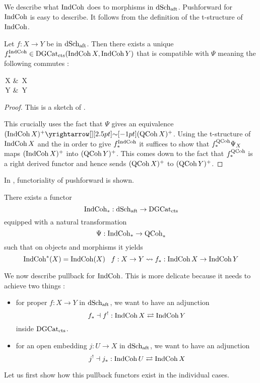 \documentclass[./main.tex]{subfiles}
\begin{document}
We describe what $\mathrm{IndCoh}$ does to morphisms in $\mathrm{dSch}_{\mathrm{aft}}$.
Pushforward for $\mathrm{IndCoh}$ is easy to describe.
It follows from the definition of the t-structure of $\mathrm{IndCoh}$.

\begin{prop}

  Let $f : X \to Y$ be in $\mathrm{dSch}_{\mathrm{aft}}$.
  Then there exists a unique 
  $f_*^{\mathrm{IndCoh}} \in \mathrm{DGCat}_{\mathrm{cts}}(\mathrm{IndCoh}\,X , \mathrm{IndCoh}\,Y)$
  that is compatible with $\Psi$ meaning the following commutes :
  \begin{cd}
    {\INDCOH\,X} & {\QCOH\,X} \\
    {\INDCOH\,Y} & {\QCOH\,Y}
    \arrow["{\Psi_X}", from=1-1, to=1-2]
    \arrow["{\Psi_Y}", from=2-1, to=2-2]
    \arrow["{f_*^\INDCOH}"', from=1-1, to=2-1]
    \arrow["{f_*^\QCOH}", from=1-2, to=2-2]
  \end{cd}
\end{prop}
\begin{proof} This is a sketch of \cite[Ch 4 , 2.1.2]{GR1}.
  
  This crucially uses the fact that $\Psi$ gives an equivalence
  $(\INDCOH\,X)^+ \map{\sim}{} (\QCOH\,X)^+$.
  Using the t-structure of $\mathrm{IndCoh}\,X$ and the
  in order to give $f_*^{\mathrm{IndCoh}}$
  it suffices to show that $f_*^{\mathrm{QCoh}} \Psi_X$ maps
  $(\mathrm{IndCoh}\,X)^+$ into $(\mathrm{QCoh}\,Y)^+$.
  This comes down to the fact that $f_*^{\mathrm{QCoh}}$ is a right derived functor
  and hence sends $(\mathrm{QCoh}\,X)^+$ to $(\mathrm{QCoh}\,Y)^+$.
\end{proof}

In \cite[Ch 4, 2.2]{GR1}, functoriality of pushforward is shown.
\begin{prop}
  
  There exists a functor \[
    \mathrm{IndCoh}_* : \mathrm{dSch}_{\mathrm{aft}} \to \mathrm{DGCat}_{\mathrm{cts}}  
  \]
  equipped with a natural transformation \[
    \Psi : \mathrm{IndCoh}_* \to \mathrm{QCoh}_*  
  \]
  such that on objects and morphisms it yields \[
    \mathrm{IndCoh}^*(X) = \mathrm{IndCoh}(X) \,\,\,\,\, 
    f : X \to Y \rightsquigarrow  f_* : \mathrm{IndCoh}\,X \to \mathrm{IndCoh}\,Y
  \]
  \cite[Ch 4, 2.2.3]{GR1}
\end{prop} 

We now describe pullback for $\mathrm{IndCoh}$.
This is more delicate because it needs to achieve two things : 
\begin{itemize}
  \item for proper $f : X \to Y$ in $\mathrm{dSch}_{\mathrm{aft}}$,
  we want to have an adjunction \[
    f_* \dashv f^! : \mathrm{IndCoh}\,X \rightleftarrows \mathrm{IndCoh}\,Y
  \]
  inside $\mathrm{DGCat}_{\mathrm{cts}}$.
  \item for an open embedding $j : U \to X$ in $\mathrm{dSch}_{\mathrm{aft}}$,
  we want to have an adjunction \[
    j^! \dashv j_* : \mathrm{IndCoh}\,U \rightleftarrows \mathrm{IndCoh}\,X  
  \]
\end{itemize}
Let us first show how this pullback functors
exist in the individual cases.
\end{document}
